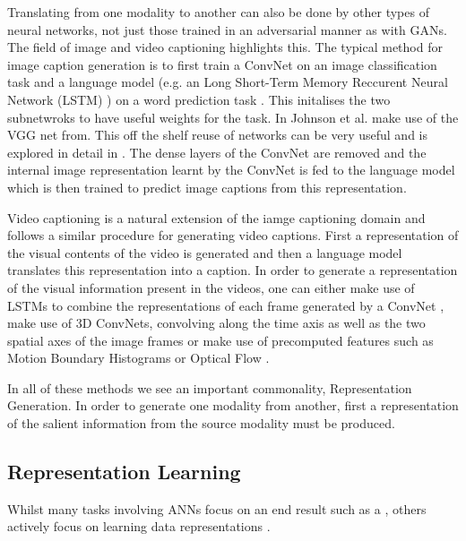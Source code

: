 Translating from one modality to another can also be done by other types of neural networks, not just those trained in an adversarial manner as with GANs.
The field of image and video captioning highlights this. The typical method for image caption generation is to first train a ConvNet on an image classification task and a language model (e.g. an Long Short-Term Memory Reccurent Neural Network (LSTM) \cite{hochreiter1997long}) on a word prediction task \cite{vinyals2015show, venugopalan2014translating, johnson2016densecap}. This initalises the two subnetwroks to have useful weights for the task. In \cite{johnson2016densecap} Johnson et al. make use of the VGG net from\cite{simonyan2014very}. This off the shelf reuse of networks can be very useful and is explored in detail in \cite{keller}.
The dense layers of the ConvNet are removed and the internal image representation learnt by the ConvNet is fed to the language model which is then trained to predict image captions from this representation.

Video captioning is a natural extension of the iamge captioning domain and follows a similar procedure for generating video captions. First a representation of the visual contents of the video is generated and then a language model translates this representation into a caption. In order to generate a representation of the visual information  present in the videos, one can either make use of LSTMs to combine the representations of each frame generated by a ConvNet \cite{donahue2015long}, make use of 3D ConvNets, convolving along the time axis as well as the two spatial axes of the image frames \cite{yao2015describing, yao2015video} or make use of precomputed features such as Motion Boundary Histograms or Optical Flow \cite{rohrbach2014coherent, rohrbach2013translating}.

In all of these methods we see an important commonality, Representation Generation. In order to generate one modality from another, first a representation of the salient information from the source modality must be produced.

\subsection{Representation Learning}

Whilst many tasks involving ANNs focus on an end result such as a \cite{krizhevsky2012imagenet}, others actively focus on learning data representations \cite{radford2015unsupervised, silberer2014learning, chorowski2019unsupervised, vincent2010stacked, mikolov2013distributed, mikolov2013efficient, mikolov2013linguistic, feng2010visual, eslami2018neural, donahue2019large}.

